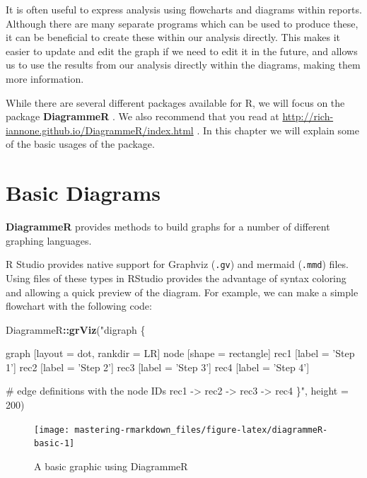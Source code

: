 \documentclass[]{book}
\newenvironment{Shaded}{\begin{snugshade}}{\end{snugshade}}
\newcommand{\KeywordTok}[1]{\textcolor[rgb]{0.13,0.29,0.53}{\textbf{#1}}}
\newcommand{\DataTypeTok}[1]{\textcolor[rgb]{0.13,0.29,0.53}{#1}}
\newcommand{\DecValTok}[1]{\textcolor[rgb]{0.00,0.00,0.81}{#1}}
\newcommand{\StringTok}[1]{\textcolor[rgb]{0.31,0.60,0.02}{#1}}
\newcommand{\OperatorTok}[1]{\textcolor[rgb]{0.81,0.36,0.00}{\textbf{#1}}}
\newcommand{\NormalTok}[1]{#1}
\begin{document}
It is often useful to express analysis using flowcharts and diagrams
within reports. Although there are many separate programs which can be
used to produce these, it can be beneficial to create these within our
analysis directly. This makes it easier to update and edit the graph if
we need to edit it in the future, and allows us to use the results from
our analysis directly within the diagrams, making them more information.

While there are several different packages available for R, we will
focus on the package \textbf{DiagrammeR} \citep{R-DiagrammeR}. We also
recommend that you read at
\url{http://rich-iannone.github.io/DiagrammeR/index.html} . In this
chapter we will explain some of the basic usages of the package.

\section{Basic Diagrams}\label{basic-diagrams}

\textbf{DiagrammeR} provides methods to build graphs for a number of
different graphing languages.

R Studio provides native support for Graphviz (\texttt{.gv}) and mermaid
(\texttt{.mmd}) files. Using files of these types in RStudio provides
the advantage of syntax coloring and allowing a quick preview of the
diagram. For example, we can make a simple flowchart with the following
code:

\begin{Shaded}
\begin{Highlighting}[]
\NormalTok{DiagrammeR}\OperatorTok{::}\KeywordTok{grViz}\NormalTok{(}\StringTok{"digraph \{}

\StringTok{        graph [layout = dot, rankdir = LR]}
\StringTok{        }
\StringTok{        node [shape = rectangle]        }
\StringTok{        rec1 [label = 'Step 1']}
\StringTok{        rec2 [label = 'Step 2']}
\StringTok{        rec3 [label =  'Step 3']}
\StringTok{        rec4 [label = 'Step 4']}

\StringTok{        # edge definitions with the node IDs}
\StringTok{        rec1 -> rec2 -> rec3 -> rec4}
\StringTok{        \}"}\NormalTok{,}
        \DataTypeTok{height =} \DecValTok{200}\NormalTok{)}
\end{Highlighting}
\end{Shaded}

\begin{figure}

{\centering \texttt{[image: mastering-rmarkdown\_files/figure-latex/diagrammeR-basic-1]} 

}

\caption{A basic graphic using DiagrammeR}\label{fig:diagrammeR-basic}
\end{figure}
\end{document}
